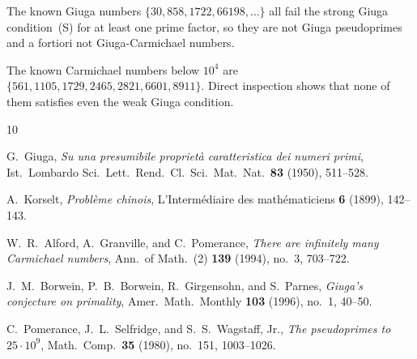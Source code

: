 \documentclass[12pt,a4paper]{amsart}
\theoremstyle{definition}
\begin{document}
The known Giuga numbers $\{30, 858, 1722, 66198, \ldots\}$ all fail the strong
Giuga condition~(S) for at least one prime factor, so they are not Giuga
pseudoprimes and a fortiori not Giuga-Carmichael numbers.

The known Carmichael numbers below $10^4$ are $\{561, 1105, 1729, 2465, 2821,
6601, 8911\}$. Direct inspection shows that none of them satisfies even the
weak Giuga condition.

\begin{thebibliography}{10}

G.~Giuga,
\emph{Su una presumibile propriet\`a caratteristica dei numeri primi},
Ist.\ Lombardo Sci.\ Lett.\ Rend.\ Cl.\ Sci.\ Mat.\ Nat.\ \textbf{83}
(1950), 511--528.

A.~Korselt,
\emph{Probl\`eme chinois},
L'Interm\'ediaire des math\'ematiciens \textbf{6} (1899), 142--143.

W.~R.~Alford, A.~Granville, and C.~Pomerance,
\emph{There are infinitely many Carmichael numbers},
Ann.\ of Math.\ (2) \textbf{139} (1994), no.\ 3, 703--722.

J.~M.~Borwein, P.~B.~Borwein, R.~Girgensohn, and S.~Parnes,
\emph{Giuga's conjecture on primality},
Amer.\ Math.\ Monthly \textbf{103} (1996), no.\ 1, 40--50.

C.~Pomerance, J.~L.~Selfridge, and S.~S.~Wagstaff, Jr.,
\emph{The pseudoprimes to $25 \cdot 10^9$},
Math.\ Comp.\ \textbf{35} (1980), no.\ 151, 1003--1026.

\end{thebibliography}
\end{document}
